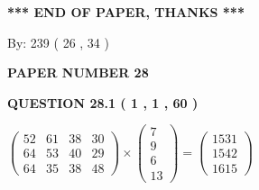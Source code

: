 \documentclass[12pt]{article}
\begin{document}
   
   
   
   
\vspace{1.0in} 
{\textbf{\large{ *** END OF PAPER, THANKS *** }}} 
   
   
\hspace{1.0in} By: 
         239 (          26 ,           34 )
   
   
   
   
\newpage 
\setcounter{page}{ 
    28001 } 
   
   
 {\textbf{ \Large{ PAPER NUMBER           28  }}}
   
   
   
   
  
  
{\textbf{\large{QUESTION
28.1 
 (           1 ,           1 ,          60 )
}}}

 
$\left( \begin{array}{ccccccccccccccc}
          52  & 
          61  & 
          38  & 
          30  \\ 
          64  & 
          53  & 
          40  & 
          29  \\ 
          64  & 
          35  & 
          38  & 
          48
\end{array}\right) \times
\left( \begin{array}{c}
           7  \\ 
           9  \\ 
           6  \\ 
          13
\end{array}\right)  =
\left( \begin{array}{c}
        1531  \\ 
        1542  \\ 
        1615
\end{array}\right)  $
 
\end{document}
